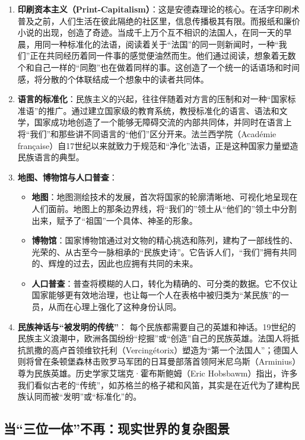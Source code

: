 \begin{enumerate}[noitemsep,topsep=0pt]
    \item \textbf{印刷资本主义（Print-Capitalism）}：这是安德森理论的核心。在活字印刷术普及之前，人们生活在彼此隔绝的社区里，信息传播极其有限。而报纸和廉价小说的出现，创造了奇迹。当成千上万个互不相识的法国人，在同一天的早晨，用同一种标准化的法语，阅读着关于“法国”的同一则新闻时，一种“我们”正在共同经历着同一件事的感觉便油然而生。他们通过阅读，想象着无数个和自己一样的“同胞”也在做着同样的事。这创造了一个统一的话语场和时间感，将分散的个体联结成一个想象中的读者共同体。
    \item \textbf{语言的标准化}：民族主义的兴起，往往伴随着对方言的压制和对一种“国家标准语”的推广。通过建立国家级的教育系统，教授标准化的语言、语法和文学，国家成功地创造了一个能够无障碍交流的内部共同体，并同时在语言上将“我们”和那些讲不同语言的“他们”区分开来。法兰西学院（Académie française）自17世纪以来就致力于规范和“净化”法语，正是这种国家力量塑造民族语言的典型。
    \item \textbf{地图、博物馆与人口普查}：
    \begin{itemize}[noitemsep,topsep=0pt]
        \item \textbf{地图}：地图测绘技术的发展，首次将国家的轮廓清晰地、可视化地呈现在人们面前。地图上的那条边界线，将“我们的”领土从“他们的”领土中分割出来，赋予了“祖国”一个具体、神圣的形象。
        \item \textbf{博物馆}：国家博物馆通过对文物的精心挑选和陈列，建构了一部线性的、光荣的、从古至今一脉相承的“民族史诗”。它告诉人们，“我们”拥有共同的、辉煌的过去，因此也应拥有共同的未来。
        \item \textbf{人口普查}：普查将模糊的人口，转化为精确的、可分类的数据。它不仅让国家能够更有效地治理，也让每一个人在表格中被归类为“某民族”的一员，从而在心理上强化了这种身份认同。
    \end{itemize}
    \item \textbf{民族神话与“被发明的传统”}：
    每个民族都需要自己的英雄和神话。19世纪的民族主义浪潮中，欧洲各国纷纷“挖掘”或“创造”自己的民族英雄。法国人将抵抗凯撒的高卢首领维钦托利（Vercingétorix）塑造为“第一个法国人”；德国人则将曾在条顿堡森林击败罗马军团的日耳曼部落首领阿米尼乌斯（Arminius）尊为民族英雄。历史学家艾瑞克·霍布斯鲍姆（Eric Hobsbawm）指出，许多我们看似古老的“传统”，如苏格兰的格子裙和风笛，其实是在近代为了建构民族认同而被“发明”或“标准化”的。
\end{enumerate}

\subsection{当“三位一体”不再：现实世界的复杂图景}

